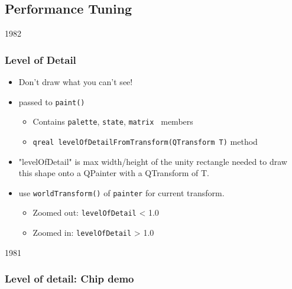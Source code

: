 %
%
%
%

\subsection{Performance Tuning}



\begin{slide}{1982}

\frametitle{Level of Detail}
\begin{itemize}
\item Don't draw what you can't see!
\item {} passed to \texttt{paint()}

    \begin{itemize}
    \item Contains \texttt{palette}, \texttt{state}, \texttt{matrix
    } members
    \item \texttt{qreal levelOfDetailFromTransform(QTransform T)} method   
    \end{itemize}
\item "levelOfDetail" is max width/height of the unity rectangle
needed to draw this shape onto a QPainter with a QTransform of T.
\item use \texttt{worldTransform()} of \texttt{painter} for current transform.
    \begin{itemize}
    \item Zoomed out: \texttt{levelOfDetail} < 1.0
    \item Zoomed in: \texttt{levelOfDetail} > 1.0
    \end{itemize}
\end{itemize}
\end{slide}

\begin{slide}[fragile]{1981}


\frametitle{Level of detail: Chip demo}

\end{slide}


